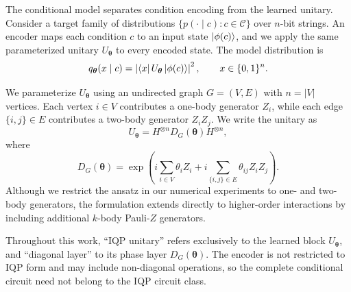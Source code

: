\documentclass[pra,aps,10pt,twocolumn,floatfix,superscriptaddress, notitlepage,longbibliography]{revtex4-2}
\begin{document}
The conditional model separates condition encoding from the learned unitary. Consider a target family of distributions $\{p(\cdot\mid c):c\in\mathcal C\}$ over $n$-bit strings. An encoder maps each condition $c$ to an input state $\ket{\phi(c)}$, and we apply the same parameterized unitary $U_{\boldsymbol\theta}$ to every encoded state. The model distribution is
\begin{equation}
    q_{\boldsymbol{\theta}}(x\mid c)
    =\left|\bra{x}U_{\boldsymbol{\theta}}\ket{\phi(c)}\right|^2,
    \qquad x\in\{0,1\}^n .
    \label{eq:conditional-model}
\end{equation}

We parameterize $U_{\boldsymbol\theta}$ using an undirected graph $G=(V,E)$ with $n=|V|$ vertices. Each vertex $i\in V$ contributes a one-body generator $Z_i$, while each edge $\{i,j\}\in E$ contributes a two-body generator $Z_iZ_j$. We write the unitary as
\begin{equation}
    U_{\boldsymbol{\theta}}
    =H^{\otimes n}D_G(\boldsymbol{\theta})H^{\otimes n},
    \label{eq:iqp-unitary}
\end{equation}
where
\begin{equation}
    D_G(\boldsymbol{\theta})
    =\exp\left(
        i\sum_{i\in V}\theta_i Z_i
        +i\sum_{\{i,j\}\in E}\theta_{ij}Z_iZ_j
    \right).
    \label{eq:graph-diagonal}
\end{equation}
Although we restrict the ansatz in our numerical experiments to one- and two-body generators, the formulation extends directly to higher-order interactions by including additional $k$-body Pauli-$Z$ generators.

Throughout this work, ``IQP unitary'' refers exclusively to the learned block $U_{\boldsymbol\theta}$, and ``diagonal layer'' to its phase layer $D_G(\boldsymbol\theta)$. The encoder is not restricted to IQP form and may include non-diagonal operations, so the complete conditional circuit need not belong to the IQP circuit class.
\end{document}
